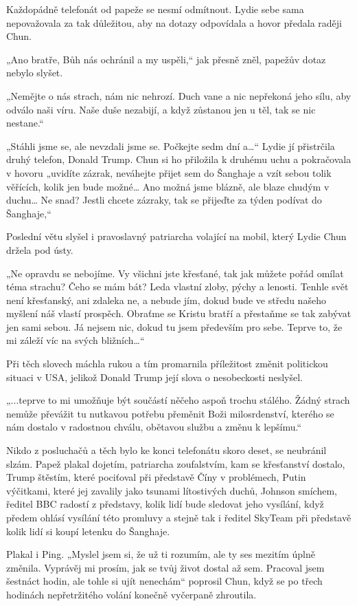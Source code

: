 Každopádně telefonát od papeže se nesmí odmítnout. Lydie sebe sama nepovažovala za tak důležitou, aby na dotazy odpovídala a hovor předala raději Chun.

„Ano bratře, Bůh nás ochránil a my uspěli,“ jak přesně zněl, papežův dotaz nebylo slyšet.

„Nemějte o nás strach, nám nic nehrozí. Duch vane a nic nepřekoná jeho sílu, aby odválo naši víru. Naše duše nezabijí, a když zůstanou jen u těl, tak se nic nestane.“

„Stáhli jsme se, ale nevzdali jsme se. Počkejte sedm dní a…“ Lydie jí přistrčila druhý telefon, Donald Trump. Chun si ho přiložila k druhému uchu a pokračovala v hovoru „uvidíte zázrak, neváhejte přijet sem do Šanghaje a vzít sebou tolik věřících, kolik jen bude možné… Ano možná jsme blázně, ale blaze chudým v duchu… Ne snad? Jestli chcete zázraky, tak se přijeďte za týden podívat do Šanghaje,“

Poslední větu slyšel i pravoslavný patriarcha volající na mobil, který Lydie Chun držela pod ústy.

„Ne opravdu se nebojíme. Vy všichni jste křesťané, tak jak můžete pořád omílat téma strachu? Čeho se mám bát? Leda vlastní zloby, pýchy a lenosti. Tenhle svět není křesťanský, ani zdaleka ne, a nebude jím, dokud bude ve středu našeho myšlení náš vlastí prospěch. Obraťme se Kristu bratří a přestaňme se tak zabývat jen sami sebou. Já nejsem nic, dokud tu jsem především pro sebe. Teprve to, že mi záleží víc na svých bližních…“ 

Při těch slovech máchla rukou a tím promarnila příležitost změnit politickou situaci v USA, jelikož Donald Trump její slova o nesobeckosti neslyšel.
 
 „...teprve to mi umožňuje být součástí něčeho aspoň trochu stálého. Žádný strach nemůže převážit tu nutkavou potřebu přeměnit Boži milosrdenství, kterého se nám dostalo v radostnou chválu, obětavou službu a změnu k lepšímu.“

Nikdo z posluchačů a těch bylo ke konci telefonátu skoro deset, se neubránil slzám. Papež plakal dojetím, patriarcha zoufalstvím, kam se křesťanství dostalo, Trump štěstím, které pociťoval při představě Číny v problémech, Putin výčitkami, které jej zavalily jako tsunami lítostivých duchů, Johnson smíchem, ředitel BBC radostí z představy, kolik lidí bude sledovat jeho vysílání, když předem ohlásí vysílání této promluvy a stejně tak i ředitel SkyTeam při představě kolik lidí si koupí letenku do Šanghaje. 

Plakal i Ping. „Myslel jsem si, že už ti rozumím, ale ty ses mezitím úplně změnila. Vyprávěj mi prosím, jak se tvůj život dostal až sem. Pracoval jsem šestnáct hodin, ale tohle si ujít nenechám“ poprosil Chun, když se po třech hodinách nepřetržitého volání konečně vyčerpaně zhroutila.

